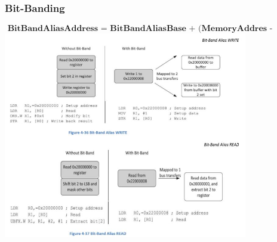 \subsubsection{Bit-Banding}
\[\textbf{ BitBandAliasAddress = BitBandAliasBase + (MemoryAddres - BitbandRegionBase)* 32 + 4*BitNumber} \]
    \includegraphics[width=0.8\textwidth]{images/bitbanding}